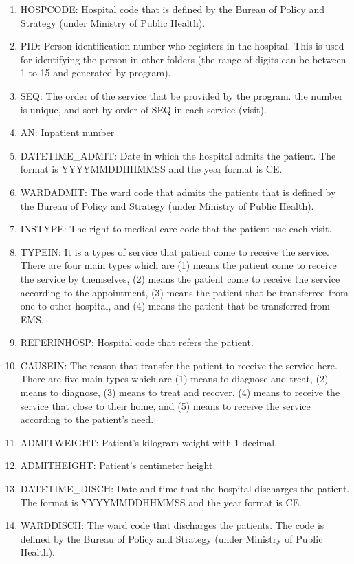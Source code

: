 \begin{enumerate}
  \item HOSPCODE: Hospital code that is defined by the Bureau of Policy and Strategy (under Ministry of Public Health). 
  \item PID: Person identification number who registers in the hospital. This is used for identifying the person in other folders (the range of digits can be between 1 to 15 and generated by program).
  \item SEQ: The order of the service that be provided by the program. the number is unique, and sort by order of SEQ in each service (visit).
  \item AN: Inpatient number
  \item DATETIME\_ADMIT: Date in which the hospital admits the patient. The format is YYYYMMDDHHMMSS and the year format is CE.
  \item WARDADMIT: The ward code that admits the patients that is defined by the Bureau of Policy and Strategy (under Ministry of Public Health).
  \item INSTYPE: The right to medical care code that the patient use each visit.
  \item TYPEIN: It is a types of service that patient come to receive the service. There are four main types which are (1) means the patient come to receive the service by themselves, (2) means the patient come to receive the service according to the appointment, (3) means the patient that be transferred from one to other hospital, and (4) means the patient that be transferred from EMS.
  \item REFERINHOSP: Hospital code that refers the patient.
  \item CAUSEIN: The reason that transfer the patient to receive the service here. There are five main types which are (1) means to diagnose and treat, (2) means to diagnose, (3) means to treat and recover, (4) means to receive the service that close to their home, and (5) means to receive the service according to the patient's need.
  \item ADMITWEIGHT: Patient's kilogram weight with 1 decimal.
  \item ADMITHEIGHT: Patient's centimeter height.
  \item DATETIME\_DISCH: Date and time that the hospital discharges the patient. The format is YYYYMMDDHHMMSS and the year format is CE.
  \item WARDDISCH: The ward code that discharges the patients. The code is defined by the Bureau of Policy and Strategy (under Ministry of Public Health).

\end{enumerate}
